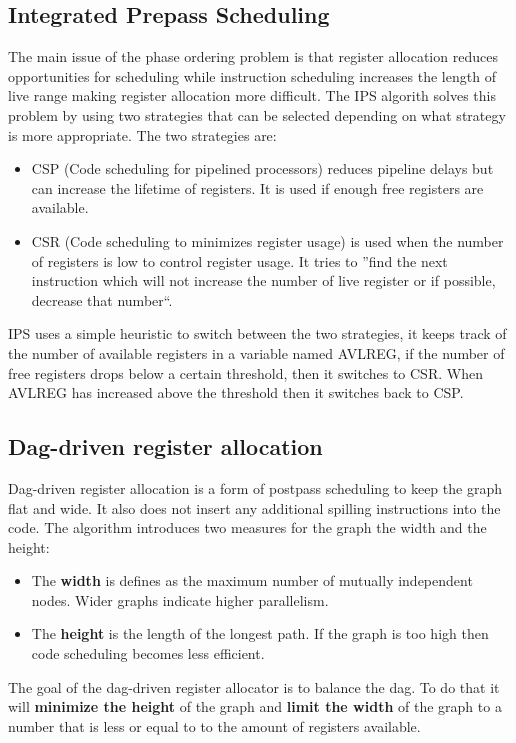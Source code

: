 \documentclass[a4paper,10pt]{article}
\begin{document}
\subsection{Integrated Prepass Scheduling}
The main issue of the phase ordering problem is that register allocation reduces opportunities for scheduling while instruction scheduling 
increases the length of live range making register allocation more difficult. The IPS algorith solves this problem by using two strategies 
that can be selected depending on what strategy is more appropriate. The two strategies are:
\begin{itemize}
 \item CSP (Code scheduling for pipelined processors) reduces pipeline delays but can increase the lifetime of registers. It is used if 
       enough free registers are available.
 \item CSR (Code scheduling to minimizes register usage) is used when the number of registers is low to control register usage. It tries
to ''find the next instruction which will not increase the number of live register or if possible, decrease that number``.
\end{itemize}
IPS uses a simple heuristic to switch between the two strategies, it keeps track of the number of available registers in a variable named 
AVLREG, if the number of free registers drops below a certain threshold, then it switches to CSR. When AVLREG has increased above the 
threshold then it switches back to CSP.

\subsection{Dag-driven register allocation}
Dag-driven register allocation is a form of postpass scheduling to keep the graph flat and wide. It also does not insert any 
additional spilling instructions into the code. The algorithm introduces two measures for the graph the width and the height:
\begin{itemize}
 \item The \textbf{width} is defines as the maximum number of mutually independent nodes. Wider graphs indicate higher parallelism.
 \item The \textbf{height} is the length of the longest path. If the graph is too high then code scheduling becomes less efficient.
\end{itemize}
The goal of the dag-driven register allocator is to balance the dag. To do that it will \textbf{minimize the height} of the graph and 
\textbf{limit the width} of the graph to a number that is less or equal to to the amount of registers available.
\end{document}
